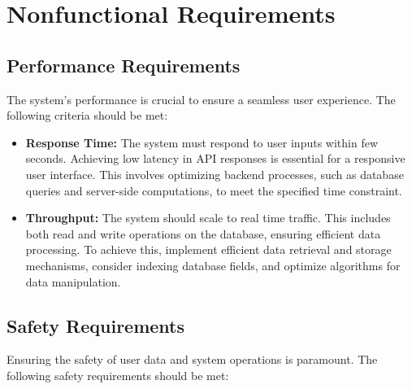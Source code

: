 \documentclass{article}
\begin{document}


\newpage
\newpage
\section{Nonfunctional Requirements}

\vspace{1em}  %

\subsection{Performance Requirements}
The system's performance is crucial to ensure a seamless user experience. The following criteria should be met:

\vspace{1em}  %

\begin{itemize}
    \item \textbf{Response Time:} The system must respond to user inputs within few seconds. Achieving low latency in API responses is essential for a responsive user interface. This involves optimizing backend processes, such as database queries and server-side computations, to meet the specified time constraint.

    \item \textbf{Throughput:} The system should scale to real time traffic. This includes both read and write operations on the database, ensuring efficient data processing. To achieve this, implement efficient data retrieval and storage mechanisms, consider indexing database fields, and optimize algorithms for data manipulation.
\end{itemize}

\vspace{1em}  %

\subsection{Safety Requirements}
Ensuring the safety of user data and system operations is paramount. The following safety requirements should be met:

\vspace{1em}  %
\end{document}
